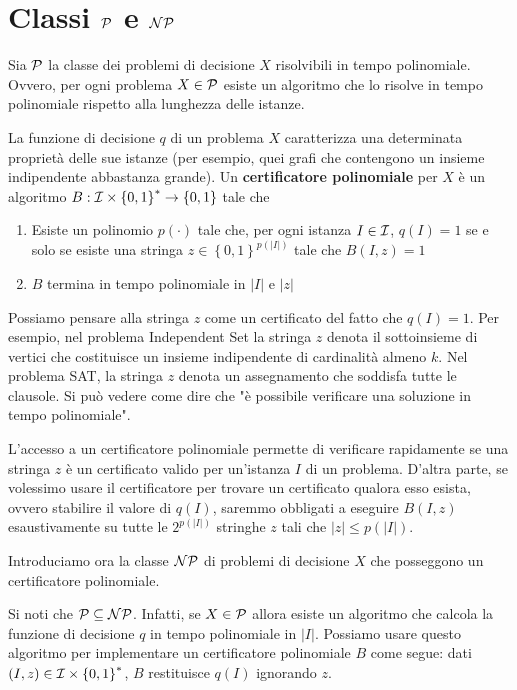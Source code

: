 \section{Classi $\P$ e $\NP$}

Sia $\P$ la classe dei problemi di decisione $X$ risolvibili in tempo polinomiale. Ovvero, per ogni problema $X \in \P$ esiste un algoritmo che lo risolve in tempo polinomiale rispetto alla lunghezza delle istanze.

La funzione di decisione $q$ di un problema $X$ caratterizza una determinata proprietà delle sue istanze (per esempio, quei grafi che contengono un insieme indipendente abbastanza grande). Un \textbf{certificatore polinomiale} per $X$ è un algoritmo $B: \I \times \left\{0,1\right\}^\ast \rightarrow \left\{0,1\right\}$ tale che
\begin{enumerate}
    \item Esiste un polinomio $p(\cdot)$ tale che, per ogni istanza $I \in \I$, $q(I) = 1$ se e solo se esiste una stringa $z \in \left\{0,1\right\}^{p(|I|)}$ tale che $B(I,z) = 1$

    \item $B$ termina in tempo polinomiale in $|I|$ e $|z|$
\end{enumerate}

Possiamo pensare alla stringa $z$ come un certificato del fatto che $q(I) = 1$. Per esempio, nel problema Independent Set la stringa $z$ denota il sottoinsieme di vertici che costituisce un insieme indipendente di cardinalità almeno $k$. Nel problema SAT, la stringa $z$ denota un assegnamento che soddisfa tutte le clausole. Si può vedere come dire che "è possibile verificare una soluzione in tempo polinomiale".

L'accesso a un certificatore polinomiale permette di verificare rapidamente se una stringa $z$ è un certificato valido per un'istanza $I$ di un problema. D'altra parte, se volessimo usare il certificatore per trovare un certificato qualora esso esista, ovvero stabilire il valore di $q(I)$, saremmo obbligati a eseguire $B(I,z)$ esaustivamente su tutte le $2^{p(|I|)}$ stringhe $z$ tali che $|z| \leq p(|I|)$.

Introduciamo ora la classe $\NP$ di problemi di decisione $X$ che posseggono un certificatore polinomiale.

Si noti che $\P \subseteq \NP$. Infatti, se $X \in \P$ allora esiste un algoritmo che calcola la funzione di decisione $q$ in tempo polinomiale in $|I|$. Possiamo usare questo algoritmo per implementare un certificatore polinomiale $B$ come segue: dati $(I, z) \in \I \times \left\{0,1\right\}^\ast$, $B$ restituisce $q(I)$ ignorando $z$.

